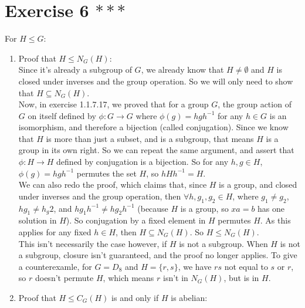 \documentclass{article}
\begin{document}
    \section*{Exercise 6 $***$}
    For $H \leqslant G$: \\
    \begin{enumerate}[label=\textbf{\alph*.}]
        \item    
            Proof that $H \leqslant N_G(H)$: \\
            Since it's already a subgroup of $G$,
            we already know that $H \neq \emptyset$
            and $H$ is closed under inverses and the group operation.
            So we will only need to show that $H \subseteq N_G(H)$. \\
            Now, in exercise 1.1.7.17,
            we proved that for a group $G$,
            the group action of $G$ on itself defined by
            $\phi: G \to G$ where $\phi(g) = hgh^{-1}$ for any
            $h \in G$ is an isomorphism,
            and therefore a bijection (called conjugation).
            Since we know that $H$ is more than just a subset,
            and is a subgroup, that means $H$ is a group in its own right.
            So we can repeat the same argument,
            and assert that $\phi: H \to H$ defined by conjugation
            is a bijection.
            So for any $h,g \in H$, $\phi(g) = hgh^{-1}$ permutes
            the set $H$,
            so $ hHh^{-1} = H$. \\
            We can also redo the proof, which claims that,
            since $H$ is a group, and closed under inverses and the group
            operation, then $\forall h, g_1, g_2 \in H$, where $g_1 \neq g_2$,
            $hg_1 \neq h_g2$, and $hg_1h^{-1} \neq hg_2h^{-1}$
            (because $H$ is a group, so $xa = b$ has one solution in $H$).
            So conjugation by a fixed element in $H$ permutes $H$.
            As this applies for any fixed $h \in H$,
            then $H \subseteq N_G(H)$.
            So $H \leqslant N_G(H)$. \\
            This isn't necessarily the case however,
            if $H$ is not a subgroup.
            When $H$ is not a subgroup, closure isn't guaranteed,
            and the proof no longer applies.
            To give a counterexamle, for $G = D_8$ and $H = \{r, s\}$,
            we have $rs$ not equal to $s$ or $r$, so
            $r$ doesn't permute $H$,
            which means $r$ isn't in $N_G(H)$, but is in $H$.
        \item
            Proof that $H \leqslant C_G(H)$ is and only if $H$ is abelian: \\

\end{enumerate}
\end{document}
